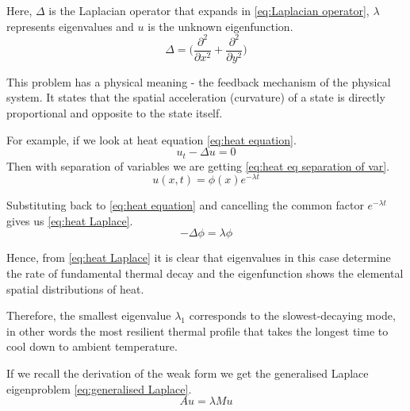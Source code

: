 \documentclass[conference]{IEEEtran}
\begin{document}
Here, $\Delta$ is the Laplacian operator that expands in \ref{eq:Laplacian operator}, $\lambda$ represents eigenvalues and $u$ is the unknown eigenfunction.
\begin{equation}
    \Delta = \Bigg(\frac{\partial^2}{\partial x^2} + \frac{\partial^2}{\partial y^2}\Bigg)
    \label{eq:Laplacian operator}
\end{equation}

This problem has a physical meaning - the feedback mechanism of the physical system. It states that the spatial acceleration (curvature) of a state is directly proportional and opposite to the state itself.

For example, if we look at heat equation \ref{eq:heat equation}.
\begin{equation}
    u_t - \Delta u = 0
    \label{eq:heat equation}
\end{equation}
Then with separation of variables we are getting \ref{eq:heat eq separation of var}.
\begin{equation}
    u(x, t) = \phi(x)e^{-\lambda t}
    \label{eq:heat eq separation of var}
\end{equation}

Substituting back to \ref{eq:heat equation} and cancelling the common factor $e^{-\lambda t}$ gives us \ref{eq:heat Laplace}.
\begin{equation}
    -\Delta\phi = \lambda\phi
    \label{eq:heat Laplace}
\end{equation}

Hence, from \ref{eq:heat Laplace} it is clear that eigenvalues in this case determine the rate of fundamental thermal decay and the eigenfunction shows the elemental spatial distributions of heat.

Therefore, the smallest eigenvalue $\lambda_1$ corresponds to the slowest-decaying mode, in other words the most resilient thermal profile that takes the longest time to cool down to ambient temperature.

If we recall the derivation of the weak form we get the generalised Laplace eigenproblem \ref{eq:generalised Laplace}.
\begin{equation}
    Au = \lambda Mu
    \label{eq:generalised Laplace}
\end{equation}


\subsection{
}
\end{document}
